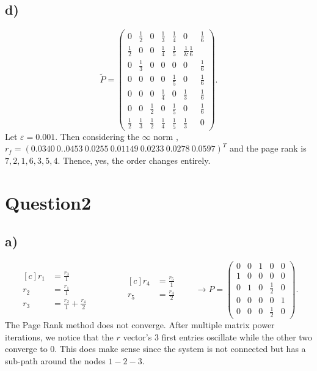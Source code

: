 \documentclass[12pt]{article}
\theoremstyle{definition}
\theoremstyle{definition}
\theoremstyle{definition}
\theoremstyle{definition}
\theoremstyle{definition}
\theoremstyle{example}
\theoremstyle{note}
\theoremstyle{remark}
\theoremstyle{example}
\begin{document}
		\subsection*{d) }
			\begin{equation}
				\widetilde{P} = \begin{pmatrix}
				0 & \frac12 &0 &\frac13 &\frac14 &0 &\frac16\\ 
				\frac12& 0& 0& \frac14& \frac15 &\frac1&\frac16 \\
				0 &\frac13& 0 &0 & 0& 0 &\frac16 \\
				0 &0 &0 &0& \frac15& 0&\frac16 \\
				0 &0 &0 &\frac14 &0 &\frac13 &\frac16\\
				0 &0& \frac12& 0& \frac15 &0 &\frac16 \\
				\frac12 & \frac13 & \frac12 & \frac14 & \frac15 & \frac13 & 0
				\end{pmatrix}.
			\end{equation}
			Let $\varepsilon =0.001$. Then considering the $\infty$ norm ,$r_{f} = (0.0340 \ 0..0453 \ 0.0255 \ 0.01149 \ 0.0233 \ 0.0278 \ 0.0597)^{T}$ and the page rank is $7,2,1,6,3,5,4$. Thence, yes, the order changes entirely. 
		\section*{Question2  } 
			\subsection*{a) } 
				\begin{equation}
					\begin{aligned}[c]
						r_{1} &= \frac{r_{3}}{1} \\
						r_{2} &= \frac{r_{1}}{1} \\
						r_{3} &= \frac{r_{2}}{1} + \frac{r_{4}}{2} 
					\end{aligned}
					\qquad\qquad
					\begin{aligned}[c]
						r_{4} &= \frac{r_{5}}{1} \\
						r_{5} &= \frac{r_{4}}{2} \\
						& 
					\end{aligned}
					\qquad  \longrightarrow
					P = \begin{pmatrix}
						0 & 0 & 1 & 0 & 0 \\
							1 & 0 & 0 & 0 & 0 \\
								0 & 1 & 0 & \frac12 & 0 \\
									0 & 0 & 0 & 0 & 1 \\
										0 & 0 & 0 & \frac12 & 0 
					\end{pmatrix}.
				\end{equation}
				The Page Rank method does not converge. After multiple matrix power iterations, we notice that the $r$ vector's $3$ first entries oscillate while the other two converge to $0$. This does make sense since the system is not connected but has a sub-path around the nodes $1-2-3$.
\end{document}

